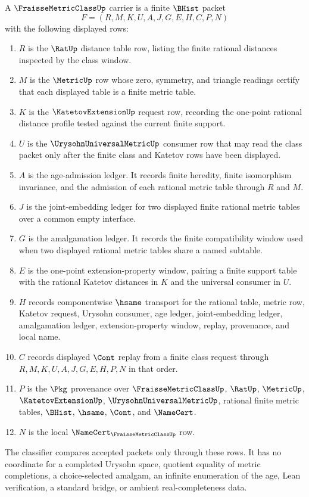 \begin{definition}
\label{def:fraisse-metric-class-carrier}
A $\FraisseMetricClassUp$ carrier is a finite $\BHist$ packet
$$
F=(R,M,K,U,A,J,G,E,H,C,P,N)
$$
with the following displayed rows:
\begin{enumerate}
\item $R$ is the $\RatUp$ distance table row, listing the finite rational distances inspected by the class window.
\item $M$ is the $\MetricUp$ row whose zero, symmetry, and triangle readings certify that each displayed table is a finite metric table.
\item $K$ is the $\KatetovExtensionUp$ request row, recording the one-point rational distance profile tested against the current finite support.
\item $U$ is the $\UrysohnUniversalMetricUp$ consumer row that may read the class packet only after the finite class and Katetov rows have been displayed.
\item $A$ is the age-admission ledger. It records finite heredity, finite isomorphism invariance, and the admission of each rational metric table through $R$ and $M$.
\item $J$ is the joint-embedding ledger for two displayed finite rational metric tables over a common empty interface.
\item $G$ is the amalgamation ledger. It records the finite compatibility window used when two displayed rational metric tables share a named subtable.
\item $E$ is the one-point extension-property window, pairing a finite support table with the rational Katetov distances in $K$ and the universal consumer in $U$.
\item $H$ records componentwise $\hsame$ transport for the rational table, metric row, Katetov request, Urysohn consumer, age ledger, joint-embedding ledger, amalgamation ledger, extension-property window, replay, provenance, and local name.
\item $C$ records displayed $\Cont$ replay from a finite class request through $R,M,K,U,A,J,G,E,H,P,N$ in that order.
\item $P$ is the $\Pkg$ provenance over $\FraisseMetricClassUp$, $\RatUp$, $\MetricUp$, $\KatetovExtensionUp$, $\UrysohnUniversalMetricUp$, rational finite metric tables, $\BHist$, $\hsame$, $\Cont$, and $\NameCert$.
\item $N$ is the local $\NameCert_{\FraisseMetricClassUp}$ row.
\end{enumerate}
The classifier compares accepted packets only through these rows. It has no coordinate for a completed Urysohn space, quotient equality of metric completions, a choice-selected amalgam, an infinite enumeration of the age, Lean verification, a standard bridge, or ambient real-completeness data.
\end{definition}

